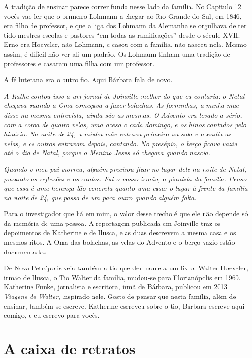 \documentclass[
  brazilian,
  11pt,
  openany]{book}
\begin{document}
A tradição de ensinar parece correr fundo nesse lado da família. No
Capítulo 12 vocês vão ler que o primeiro Lohmann a chegar ao Rio Grande
do Sul, em 1846, era filho de professor, e que a liga dos Lohmann da
Alemanha se orgulhava de ter tido mestres-escolas e pastores ``em todas
as ramificações'' desde o século XVII. Erno era Hoeveler, não Lohmann, e
casou com a família, não nasceu nela. Mesmo assim, é difícil não ver ali
um padrão. Os Lohmann tinham uma tradição de professores e casaram uma
filha com um professor.

A fé luterana era o outro fio. Aqui Bárbara fala de novo.

\emph{A Kathe contou isso a um jornal de Joinville melhor do que eu
contaria: o Natal chegava quando a Oma começava a fazer bolachas. As
forminhas, a minha mãe disse na mesma entrevista, ainda são as mesmas. O
Advento era levado a sério, com a coroa de quatro velas, uma acesa a
cada domingo, e os hinos cantados pelo hinário. Na noite de 24, a minha
mãe entrava primeiro na sala e acendia as velas, e os outros entravam
depois, cantando. No presépio, o berço ficava vazio até o dia de Natal,
porque o Menino Jesus só chegava quando nascia.}

\emph{Quando o meu pai morreu, alguém precisou ficar no lugar dele na
noite de Natal, puxando as reflexões e os cantos. Foi o nosso irmão, o
pianista da família. Penso que essa é uma herança tão concreta quanto
uma casa: o lugar à frente da família na noite de 24, que passa de um
para outro quando alguém falta.}

Para o investigador que há em mim, o valor desse trecho é que ele não
depende só da memória de uma pessoa. A reportagem publicada em Joinville
traz os depoimentos de Katherine e de Ilusca, e as duas descrevem a
mesma casa e os mesmos ritos. A Oma das bolachas, as velas do Advento e
o berço vazio estão documentados.

De Nova Petrópolis veio também o tio que deu nome a um livro. Walter
Hoeveler, irmão de Ilusca, o Tio Walter da família, mudou-se para
Florianópolis em 1960. Katherine Funke, jornalista e escritora, irmã de
Bárbara, publicou em 2013 \emph{Viagens de Walter}, inspirado nele.
Gosto de pensar que nesta família, além de ensinar, também se escreve.
Katherine escreveu sobre o tio, Bárbara escreve aqui comigo, e eu
escrevo para vocês.

\section{A caixa de retratos}\label{a-caixa-de-retratos}
\end{document}
